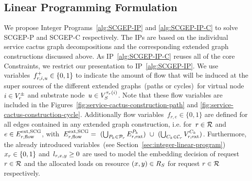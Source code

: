 \documentclass[10pt, conference, letterpaper]{IEEEtran}
\begin{document}
\subsection{Linear Programming Formulation}
\label{sec:cactus-linear-programming}
We propose Integer Programs~\ref{alg:SCGEP-IP} and \ref{alg:SCGEP-IP-C} to solve SCGEP-P and SCGEP-C respectively. The IPs are based on the individual service cactus graph decompositions and the corresponding extended graph constructions discussed above. As IP~\ref{alg:SCGEP-IP-C} reuses all of the core Constraints, we restrict our presentation to IP~\ref{alg:SCGEP-IP}.
We use variables~$\varFlowInput \in \{0,1\}$ to indicate the amount of flow that will be induced at the super sources of the different
extended graphs~(paths or cycles)~for virtual node $i \in \VVSourcesTargets$ and substrate node~$u \in \SVTypes[\Vtype(i)]$. Note that these flow variables are included in the Figures~\ref{fig:service-cactus-construction-path} and \ref{fig:service-cactus-construction-cycle}.
Additionally flow variables~$f_{r,e} \in \{0,1\}$ are defined for all edges contained in any extended graph construction, i.e. for~$\req \in \requests$  and~$e \in \VEextCGFlowEdges$, with~$\VEextCGFlowEdges =~(\bigcup_{P_k \in \Paths} \VEextpath)~\cup~(\bigcup_{C_k \in \Cycles} \VVextcycle)$. Furthermore, the already introduced variables~(see Section~\ref{sec:integer-linear-program})~$x_\req \in \{0,1\}$ and~$l_{\req, x,y} \geq 0$ are used to model the embedding decision of request $\req \in \requests$ and the allocated loads on resource $(x,y) \in  \SR$ for request $\req \in \requests$ respectively.
\end{document}
